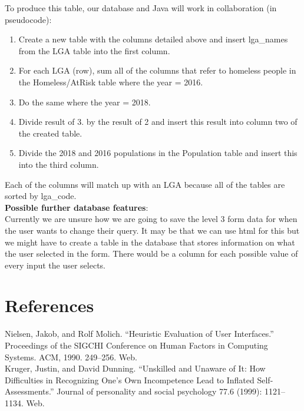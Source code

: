 \documentclass[12pt, a4paper]{article}
\begin{document}
To produce this table, our database and Java will work in collaboration (in pseudocode):
\begin{enumerate}
\item Create a new table with the columns detailed above and insert lga\_names from the LGA table into the first column.
\item For each LGA (row), sum all of the columns that refer to homeless people in the Homeless/AtRisk table where the year = 2016.
\item Do the same where the year = 2018.
\item Divide result of 3. by the result of 2 and insert this result into column two of the created table.
\item Divide the 2018 and 2016 populations in the Population table and insert this into the third column.
\end{enumerate}
Each of the columns will match up with an LGA because all of the tables are sorted by lga\_code. \\
\textbf{Possible further database features}: \\
Currently we are unsure how we are going to save the level 3 form data for when the user wants to change their query. It may be that we can use html for this but we might have to create a table in the database that stores information on what the user selected in the form. There would be a column for each possible value of every input the user selects. \\

\section{References}

Nielsen, Jakob, and Rolf Molich. “Heuristic Evaluation of User Interfaces.” Proceedings of the SIGCHI Conference on Human Factors in Computing Systems. ACM, 1990. 249–256. Web. \\

Kruger, Justin, and David Dunning. “Unskilled and Unaware of It: How Difficulties in Recognizing One’s Own Incompetence Lead to Inflated Self-Assessments.” Journal of personality and social psychology 77.6 (1999): 1121–1134. Web.
\end{document}
